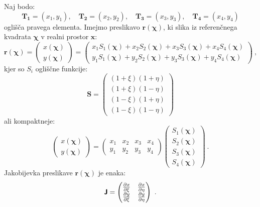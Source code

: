 Naj bodo:
\begin{equation}
   \mathbf{T_1} = (x_1,y_1), \quad \mathbf{T_2} = (x_2,y_2), \quad \mathbf{T_3} = (x_3,y_3), \quad \mathbf{T_4} = (x_4,y_4)
\end{equation}
oglišča pravega elementa. Imejmo preslikavo $\mathbf{r}(\bm{\chi})$, ki slika iz referenčnega kvadrata $\bm{\chi}$ v realni prostor $\mathbf{x}$:
\begin{equation}
   \mathbf{r}(\bm{\chi})
   =
   \begin{pmatrix}
      x(\bm{\chi}) \\
      y(\bm{\chi})
   \end{pmatrix}
   =
   \begin{pmatrix}
      x_1 S_1(\bm{\chi}) + x_2 S_2(\bm{\chi}) + x_3 S_3(\bm{\chi}) + x_4 S_4(\bm{\chi}) \\
      y_1 S_1(\bm{\chi}) + y_2 S_2(\bm{\chi}) + y_3 S_3(\bm{\chi}) + y_4 S_4(\bm{\chi})
   \end{pmatrix} \ ,
\end{equation}
kjer so $S_i$ ogliščne funkcije:
\begin{equation}
   \mathbf{S}
   =
   \begin{pmatrix}
      (1+\xi)(1+\eta) \\
      (1+\xi)(1-\eta) \\
      (1-\xi)(1+\eta) \\
      (1-\xi)(1-\eta)
   \end{pmatrix}
\end{equation}
ali kompaktneje:
\begin{equation}
   \begin{pmatrix}
      x(\bm{\chi}) \\
      y(\bm{\chi})
   \end{pmatrix}
   =
   \begin{pmatrix}
      x_1 & x_2 & x_3 & x_4 \\
      y_1 & y_2 & y_3 & y_4
   \end{pmatrix}
   \begin{pmatrix}
      S_1(\bm{\chi}) \\
      S_2(\bm{\chi}) \\
      S_3(\bm{\chi}) \\
      S_4(\bm{\chi})
   \end{pmatrix} \ .
\end{equation}
Jakobijevka preslikave $\mathbf{r}(\bm{\chi})$ je enaka:
\begin{equation}
   \bm{\mathsf{J}}
   =
   \begin{pmatrix}
      \frac{\partial x}{\partial \xi} & \frac{\partial x}{\partial \eta} \\
      \frac{\partial y}{\partial \xi} & \frac{\partial y}{\partial \eta}
   \end{pmatrix} \ .
\end{equation}
